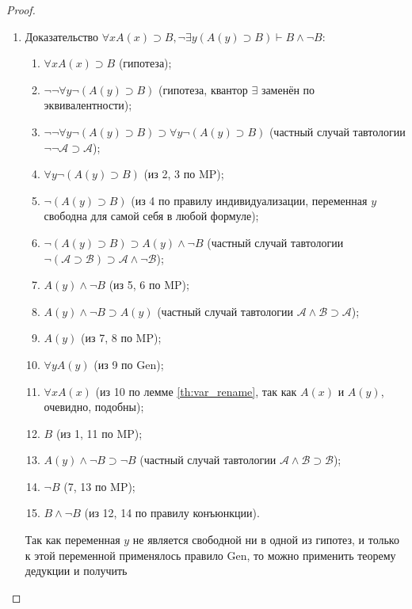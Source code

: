 \begin{proof}\leavevmode
    \begin{enumerate}[label=\arabic*)]
        \item
        Доказательство $\forall xA(x) \supset B, \neg\exists y(A(y) \supset B) \vdash B \land \neg B$:
        \begin{enumerate}[label=\arabic*.]
            \item $\forall xA(x) \supset B$ (гипотеза);
            \item $\neg\neg\forall y\neg(A(y) \supset B)$ (гипотеза, квантор $\exists$ заменён по эквивалентности);
            \item $\neg\neg\forall y\neg(A(y) \supset B) \supset \forall y\neg(A(y) \supset B)$ (частный случай тавтологии $\neg\neg\mathcal{A} \supset \mathcal{A}$);
            \item $\forall y\neg(A(y) \supset B)$ (из 2, 3 по MP);
            \item $\neg(A(y) \supset B)$ (из 4 по правилу индивидуализации, переменная $y$ свободна для самой себя в любой формуле);
            \item $\neg(A(y) \supset B) \supset A(y) \land \neg B$ (частный случай тавтологии $\neg(\mathcal{A} \supset \mathcal{B}) \supset \mathcal{A} \land \neg\mathcal{B}$);
            \item $A(y) \land \neg B$ (из 5, 6 по MP);
            \item $A(y) \land \neg B \supset A(y)$ (частный случай тавтологии $\mathcal{A} \land \mathcal{B} \supset \mathcal{A}$);
            \item $A(y)$ (из 7, 8 по MP);
            \item $\forall yA(y)$ (из 9 по Gen);
            \item $\forall xA(x)$ (из 10 по лемме \ref{th:var_rename}, так как $A(x)$ и $A(y)$, очевидно, подобны);
            \item $B$ (из 1, 11 по MP);
            \item $A(y) \land \neg B \supset \neg B$ (частный случай тавтологии $\mathcal{A} \land \mathcal{B} \supset \mathcal{B}$);
            \item $\neg B$ (7, 13 по MP);
            \item $B \land \neg B$ (из 12, 14 по правилу конъюнкции).
        \end{enumerate}
        Так как переменная $y$ не является свободной ни в одной из гипотез, и только к этой переменной применялось правило Gen, то можно применить теорему дедукции и получить

\end{enumerate}
\end{proof}
